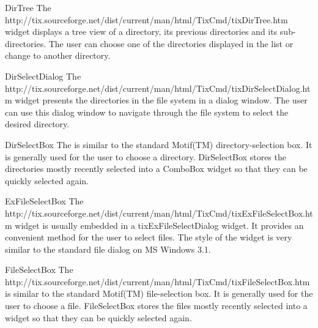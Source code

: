
\begin{classdesc}{DirTree}{}
The 
{http://tix.sourceforge.net/dist/current/man/html/TixCmd/tixDirTree.htm}
widget displays a tree view of a directory, its previous directories
and its sub-directories. The user can choose one of the directories
displayed in the list or change to another directory.
\end{classdesc}


\begin{classdesc}{DirSelectDialog}{}
The 
{http://tix.sourceforge.net/dist/current/man/html/TixCmd/tixDirSelectDialog.htm}
widget presents the directories in the file system in a dialog
window.  The user can use this dialog window to navigate through the
file system to select the desired directory.
\end{classdesc}


\begin{classdesc}{DirSelectBox}{}
The  is similar
to the standard Motif(TM) directory-selection box. It is generally used for
the user to choose a directory. DirSelectBox stores the directories mostly
recently selected into a ComboBox widget so that they can be quickly
selected again.
\end{classdesc}

\begin{classdesc}{ExFileSelectBox}{}
The 
{http://tix.sourceforge.net/dist/current/man/html/TixCmd/tixExFileSelectBox.htm}
widget is usually embedded in a tixExFileSelectDialog widget. It
provides an convenient method for the user to select files. The style
of the  widget is very similar to the standard
file dialog on MS Windows 3.1.
\end{classdesc}


\begin{classdesc}{FileSelectBox}{}
The 
{http://tix.sourceforge.net/dist/current/man/html/TixCmd/tixFileSelectBox.htm}
is similar to the standard Motif(TM) file-selection box. It is
generally used for the user to choose a file. FileSelectBox stores the
files mostly recently selected into a  widget so that
they can be quickly selected again.
\end{classdesc}


